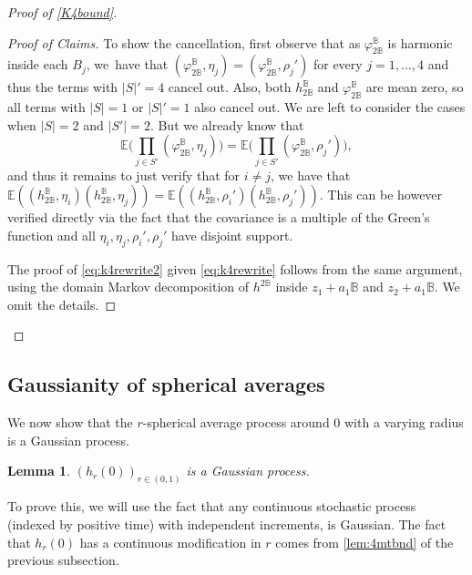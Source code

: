 \documentclass[JEP,XML,SOM,Unicode,published]{cedram}
\let\ts\textstyle
\newtheorem{lemma}[theorem]{Lemma}
\theoremstyle{definition}
\newcommand{\E}{\mathbb{E}}
\newcommand{\B}{\mathbb{B}}\let\D\B\let\Ub\B
\begin{document}
\begin{proof}[Proof of \eqref{K4bound}]
\begin{proof}[Proof of Claims]
To show the cancellation, first observe that as $\varphi^\B_{2\B}$ is harmonic inside each $B_j$, we~have that $(\varphi^\B_{2\B},\eta_j) = (\varphi^\B_{2\B},\rho_j')$ for every $j = 1, \dots, 4$ and thus the terms with $|S|' = 4$ cancel out. Also, both $h^\B_{2\B}$ and $\varphi^\B_{2\B}$ are mean zero, so all terms with $|S| = 1$ or $|S|' = 1$ also cancel out. We are left to consider the cases when $|S| = 2$ and $|S'| = 2$.
But we already know that
\[\ts
\E\bigl(\prod_{j\in S'} (\varphi^\B_{2\B},\eta_j)\bigr) = \E\bigl(\prod_{j\in S'} (\varphi^\B_{2\B},\rho_j')\bigr),
\]
and thus it remains to just verify that for $i \neq j$, we have that $\E((h^\B_{2\B},\eta_i) (h^\B_{2\B},\eta_j)) = \E((h^\B_{2\B},\rho_i') (h^\B_{2\B},\rho_j'))$. This can be however verified directly via the fact that the covariance is a multiple of the Green's function and all $\eta_i, \eta_j, \rho_i',\rho_j'$ have disjoint support.

The proof of \eqref{eq:k4rewrite2} given \eqref{eq:k4rewrite} follows from the same argument, using the domain Markov decomposition of $h^{2\B}$ inside $z_1+a_1\B$ and $z_2+a_1\B$. We omit the details.
\end{proof}
\skipqed
\end{proof}

\subsection{Gaussianity of spherical averages}

We now show that the $r$-spherical average process around $0$ with a varying radius is a Gaussian process.

\begin{lemma}\label{lem:ca_bm}
$(h_{r}(0))_{r\in(0,1)}$ is a Gaussian process.
\end{lemma}

To prove this, we will use the fact that any continuous stochastic process (indexed by positive time) with independent increments, is Gaussian. The fact that $h_r(0)$ has a continuous modification in $r$
comes from \cref{lem:4mtbnd} of the previous subsection.
\end{document}
